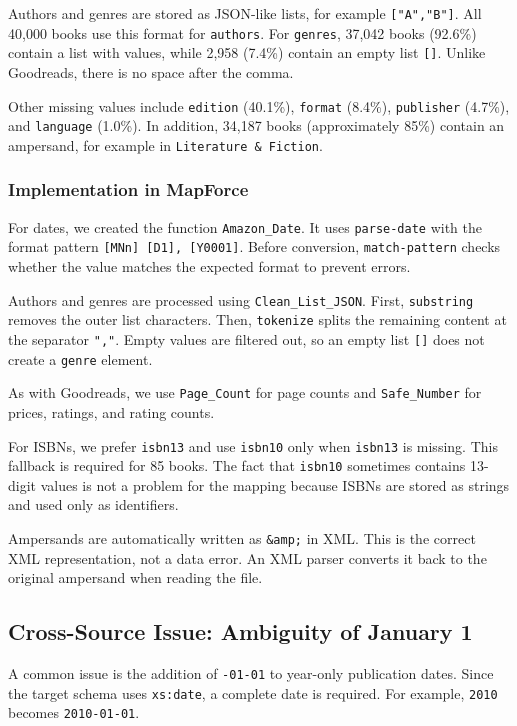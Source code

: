 \documentclass[runningheads]{llncs}
\begin{document}
Authors and genres are stored as JSON-like lists,
for example \texttt{["A","B"]}. All 40,000 books
use this format for \texttt{authors}. For
\texttt{genres}, 37,042 books (92.6\%) contain
a list with values, while 2,958 (7.4\%) contain
an empty list \texttt{[]}. Unlike Goodreads,
there is no space after the comma.

Other missing values include \texttt{edition}
(40.1\%), \texttt{format} (8.4\%),
\texttt{publisher} (4.7\%), and
\texttt{language} (1.0\%). In addition,
34,187 books (approximately 85\%) contain
an ampersand, for example in
\texttt{Literature \& Fiction}.

\subsubsection{Implementation in MapForce}

For dates, we created the function
\texttt{Amazon\_Date}. It uses
\texttt{parse-date} with the format pattern
\texttt{[MNn] [D1], [Y0001]}. Before conversion,
\texttt{match-pattern} checks whether the value
matches the expected format to prevent errors.

Authors and genres are processed using
\texttt{Clean\_List\_JSON}. First,
\texttt{substring} removes the outer list
characters. Then, \texttt{tokenize} splits
the remaining content at the separator
\texttt{","}. Empty values are filtered out,
so an empty list \texttt{[]} does not create
a \texttt{genre} element.

As with Goodreads, we use \texttt{Page\_Count}
for page counts and \texttt{Safe\_Number}
for prices, ratings, and rating counts.

For ISBNs, we prefer \texttt{isbn13} and use
\texttt{isbn10} only when \texttt{isbn13} is
missing. This fallback is required for 85 books.
The fact that \texttt{isbn10} sometimes contains
13-digit values is not a problem for the mapping
because ISBNs are stored as strings and used
only as identifiers.

Ampersands are automatically written as
\texttt{\&amp;} in XML. This is the correct
XML representation, not a data error.
An XML parser converts it back to the
original ampersand when reading the file.


\subsection{Cross-Source Issue: Ambiguity of January 1}

A common issue is the addition of \texttt{-01-01}
to year-only publication dates. Since the target
schema uses \texttt{xs:date}, a complete date is
required. For example, \texttt{2010} becomes
\texttt{2010-01-01}.
\end{document}

